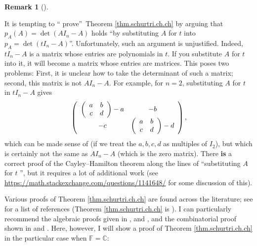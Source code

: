 \documentclass[numbers=enddot,12pt,final,onecolumn,notitlepage]{scrartcl}%
\numberwithin{exer}{subsection}
\theoremstyle{definition}
\newtheorem{remk}[theo]{Remark}
\newenvironment{remark}[1][]
{\begin{remk}[#1]\begin{leftbar}}
{\end{leftbar}\end{remk}}
\begin{document}
\begin{remark}
\label{rmk.schurtri.ch.not-that-easy}It is tempting to \textquotedblleft
prove\textquotedblright\ Theorem \ref{thm.schurtri.ch.ch} by arguing that
$p_{A}\left(  A\right)  =\det\left(  AI_{n}-A\right)  $ holds
\textquotedblleft by substituting $A$ for $t$ into $p_{A}=\det\left(
tI_{n}-A\right)  $\textquotedblright. Unfortunately, such an argument is
unjustified. Indeed, $tI_{n}-A$ is a matrix whose entries are polynomials in
$t$. If you substitute $A$ for $t$ into it, it will become a matrix whose
entries are matrices. This poses two problems: First, it is unclear how to
take the determinant of such a matrix; second, this matrix is not $AI_{n}-A$.
For example, for $n=2$, substituting $A$ for $t$ in $tI_{n}-A$ gives%
\[
\left(
\begin{array}
[c]{cc}%
\left(
\begin{array}
[c]{cc}%
a & b\\
c & d
\end{array}
\right)  -a & -b\\
-c & \left(
\begin{array}
[c]{cc}%
a & b\\
c & d
\end{array}
\right)  -d
\end{array}
\right)  ,
\]
which can be made sense of (if we treat the $a,b,c,d$ as multiples of $I_{2}%
$), but which is certainly not the same as $AI_{n}-A$ (which is the zero
matrix). There \textbf{is} a correct proof of the Cayley--Hamilton theorem
along the lines of \textquotedblleft substituting $A$ for $t$%
\textquotedblright, but it requires a lot of additional work (see
\url{https://math.stackexchange.com/questions/1141648/} for some discussion of this).
\end{remark}

Various proofs of Theorem \ref{thm.schurtri.ch.ch} are found across the
literature; see \cite[after Theorem 2.6]{trach} for a list of references
(Theorem \ref{thm.schurtri.ch.ch} is \cite[Theorem 2.5]{trach}). I can
particularly recommend the algebraic proofs given in \cite[Chapter Five,
Section IV, Lemma 1.9]{Heffer20}, \cite[\S 4, Theorem 1]{Mate16} and
\cite{Shurma15}, and the combinatorial proof shown in \cite{Straub83} and
\cite[\S 3]{Zeilbe}. Here, however, I will show a proof of Theorem
\ref{thm.schurtri.ch.ch} in the particular case when $\mathbb{F}=\mathbb{C}$:
\end{document}
